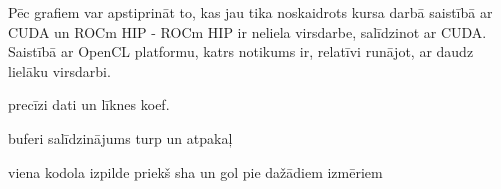 Pēc grafiem var apstiprināt to, kas jau tika noskaidrots kursa darbā saistībā
ar CUDA un ROCm HIP - ROCm HIP ir neliela virsdarbe, salīdzinot ar
CUDA.\cite{kursa-darbs} Saistībā ar OpenCL platformu, katrs notikums ir,
relatīvi runājot, ar daudz lielāku virsdarbi.

precīzi dati un līknes koef.


buferi salīdzinājums turp un atpakaļ


viena kodola izpilde priekš sha un gol pie dažādiem izmēriem
